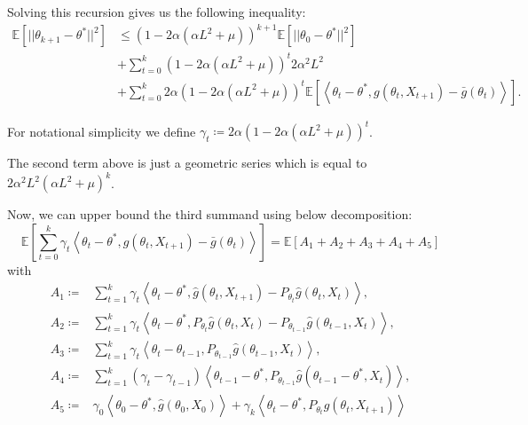 \documentclass[a4paper]{article}
\begin{document}
Solving this recursion gives us the following inequality:
\begin{equation}
	\begin{split}
		\mathbb{E}\left[||\theta_{k + 1} - \theta^{*}||^{2}\right] & \le \left(1 - 2\alpha\left(\alpha L^{2} + \mu\right)\right)^{k + 1}\mathbb{E}\left[||\theta_{0} - \theta^{*}||^{2}\right] \\
		& + \sum_{t = 0}^{k}\left(1 - 2\alpha\left(\alpha L^{2} + \mu\right)\right)^{t}2\alpha^{2}L^{2} \\
		& + \sum_{t = 0}^{k}2\alpha\left(1 - 2\alpha\left(\alpha L^{2} + \mu\right)\right)^{t}\mathbb{E}\left[\left\langle \theta_{t} - \theta^{*}, g\left(\theta_{t}, X_{t + 1}\right) - \bar{g}\left(\theta_{t}\right) \right\rangle\right].
	\end{split}
\end{equation}

For notational simplicity we define $\gamma_{t} \coloneq 2\alpha\left(1 - 2\alpha\left(\alpha L^{2} + \mu\right)\right)^{t}$.

The second term above is just a geometric series which is equal to $2\alpha^{2}L^{2}\left(\alpha L^{2} + \mu\right)^{k}$.

Now, we can upper bound the third summand using below decomposition:
\begin{equation}
	\mathbb{E}\left[ \sum_{t = 0}^{k} \gamma_{t}\left\langle \theta_{t} - \theta^{*}, g(\theta_{t}, X_{t + 1}) - \bar{g}(\theta_{t}) \right\rangle \right] = \mathbb{E}\left[ A_{1} + A_{2} + A_{3} + A_{4} + A_{5}\right]
\end{equation}
with
\begin{equation*}
	\begin{split}
		A_{1} \coloneq & \sum_{t = 1}^{k}\gamma_{t}\left\langle \theta_{t} - \theta^{*}, \hat{g}\left(\theta_{t}, X_{t + 1}\right) - P_{\theta_{t}}\hat{g}\left(\theta_{t}, X_{t}\right) \right\rangle,\\
		A_{2} \coloneq & \sum_{t = 1}^{k}\gamma_{t}\left\langle \theta_{t} - \theta^{*}, P_{\theta_{t}}\hat{g}\left(\theta_{t}, X_{t}\right) - P_{\theta_{t - 1}}\hat{g}\left( \theta_{t - 1}, X_{t} \right) \right\rangle,\\
		A_{3} \coloneq & \sum_{t = 1}^{k}\gamma_{t}\left\langle \theta_{t} - \theta_{t - 1}, P_{\theta_{t - 1}}\hat{g}\left( \theta_{t - 1}, X_{t}\right) \right\rangle,\\
		A_{4} \coloneq & \sum_{t = 1}^{k}\left(\gamma_{t} - \gamma_{t - 1}\right)\left\langle \theta_{t - 1} - \theta^{*}, P_{\theta_{t - 1}}\hat{g}\left( \theta_{t - 1} - \theta^{*}, X_{t}\right) \right\rangle,\\
		A_{5} \coloneq & \gamma_{0}\left\langle \theta_{0} - \theta^{*}, \hat{g}\left(\theta_{0}, X_{0}\right) \right\rangle + \gamma_{k}\left\langle \theta_{t} - \theta^{*}, P_{\theta_{t}}\hat{g}\left(\theta_{t}, X_{t + 1}\right)\right\rangle
	\end{split}
\end{equation*}
\end{document}
